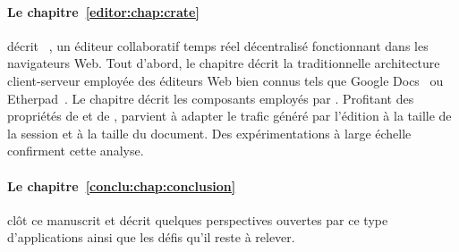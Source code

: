 \paragraph{Le chapitre~\ref{editor:chap:crate}} décrit
\CRATE~\cite{nedelec2016crate}, un éditeur collaboratif temps réel décentralisé
fonctionnant dans les navigateurs Web.  Tout d'abord, le chapitre décrit la
traditionnelle architecture client-serveur employée des éditeurs Web bien connus
tels que Google Docs~\cite{googledocs} ou Etherpad~\cite{etherpad}. 
Le chapitre décrit les composants employés par \CRATE.  Profitant des propriétés
de \SPRAY et de \LSEQ, \CRATE parvient à adapter le trafic généré par l'édition
à la taille de la session et à la taille du document. Des expérimentations à
large échelle confirment cette analyse.

\paragraph{Le chapitre~\ref{conclu:chap:conclusion}} clôt ce manuscrit et décrit
quelques perspectives ouvertes par ce type d'applications ainsi que les défis
qu'il reste à relever.


